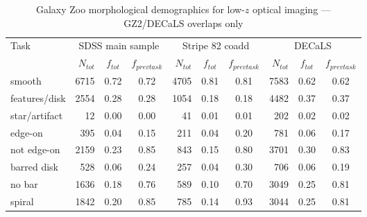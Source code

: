 \documentclass[iop,apj,tighten]{emulateapj}
\begin{document}
\begin{table*}
\centering
\caption{Galaxy Zoo morphological demographics for low-$z$ optical imaging --- GZ2/DECaLS overlaps only}\label{tbl-overlaps}
\begin{tabular}{l|rcc|rcc|rcc}
\hline\hline
    Task & \multicolumn{3}{c}{SDSS main sample} & \multicolumn{3}{c}{Stripe 82 coadd} & \multicolumn{3}{c}{DECaLS} \\
    
    & $N_{tot}$ & $f_{tot}$ & $f_{prev task}$ & $N_{tot}$ & $f_{tot}$ & $f_{prev task}$ & $N_{tot}$ & $f_{tot}$ & $f_{prev task}$ \\
    \hline
    
    smooth                  &   6715 & 0.72 & 0.72 &   4705 & 0.81 & 0.81       &   7583 & 0.62 & 0.62                                                    \\
    features/disk           &   2554 & 0.28 & 0.28 &   1054 & 0.18 & 0.18       &   4482 & 0.37 & 0.37                                                    \\
    star/artifact           &     12 & 0.00 & 0.00 &     41 & 0.01 & 0.01       &    202 & 0.02 & 0.02                                                    \\
    \hline                                                                                                                                         
    edge-on                 &    395 & 0.04 & 0.15 &    211 & 0.04 & 0.20       &    781 & 0.06 & 0.17                                                    \\
    not edge-on             &   2159 & 0.23 & 0.85 &    843 & 0.15 & 0.80       &   3701 & 0.30 & 0.83                                                    \\
    \hline                                                                                                                                         
    barred disk             &    528 & 0.06 & 0.24 &    257 & 0.04 & 0.30       &    706 & 0.06 & 0.19                                                    \\
    no bar                  &   1636 & 0.18 & 0.76 &    589 & 0.10 & 0.70       &   3049 & 0.25 & 0.81                                                    \\
    \hline                                                                                                                                         
    spiral                  &   1842 & 0.20 & 0.85 &    785 & 0.14 & 0.93       &   3044 & 0.25 & 0.81                                                    \\

\end{tabular}
\end{table*}
\end{document}
